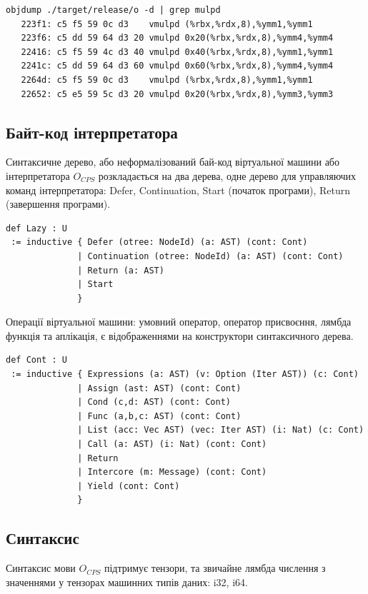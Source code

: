\begin{lstlisting}
objdump ./target/release/o -d | grep mulpd
   223f1: c5 f5 59 0c d3    vmulpd (%rbx,%rdx,8),%ymm1,%ymm1
   223f6: c5 dd 59 64 d3 20 vmulpd 0x20(%rbx,%rdx,8),%ymm4,%ymm4
   22416: c5 f5 59 4c d3 40 vmulpd 0x40(%rbx,%rdx,8),%ymm1,%ymm1
   2241c: c5 dd 59 64 d3 60 vmulpd 0x60(%rbx,%rdx,8),%ymm4,%ymm4
   2264d: c5 f5 59 0c d3    vmulpd (%rbx,%rdx,8),%ymm1,%ymm1
   22652: c5 e5 59 5c d3 20 vmulpd 0x20(%rbx,%rdx,8),%ymm3,%ymm3
\end{lstlisting}

\subsection{Байт-код інтерпретатора}
Синтаксичне дерево, або неформалізований бай-код віртуальної
машини або інтерпретатора $O_{CPS}$ розкладається на два дерева, одне дерево
для управляючих команд інтерпретатора: Defer, Continuation, Start (початок програми),
Return (завершення програми).

\begin{lstlisting}
def Lazy : U
 := inductive { Defer (otree: NodeId) (a: AST) (cont: Cont)
              | Continuation (otree: NodeId) (a: AST) (cont: Cont)
              | Return (a: AST)
              | Start
              }
\end{lstlisting}

Операції віртуальної машини: умовний оператор, оператор присвоєння, лямбда
функція та аплікація, є відображеннями на конструктори синтаксичного дерева.

\begin{lstlisting}
def Cont : U
 := inductive { Expressions (a: AST) (v: Option (Iter AST)) (c: Cont)
              | Assign (ast: AST) (cont: Cont)
              | Cond (c,d: AST) (cont: Cont)
              | Func (a,b,c: AST) (cont: Cont)
              | List (acc: Vec AST) (vec: Iter AST) (i: Nat) (c: Cont)
              | Call (a: AST) (i: Nat) (cont: Cont)
              | Return
              | Intercore (m: Message) (cont: Cont)
              | Yield (cont: Cont)
              }
\end{lstlisting}

\newpage
\subsection{Синтаксис}
Синтаксис мови $O_{CPS}$ підтримує тензори, та звичайне лямбда числення
з значеннями у тензорах машинних типів даних: i32, i64.

